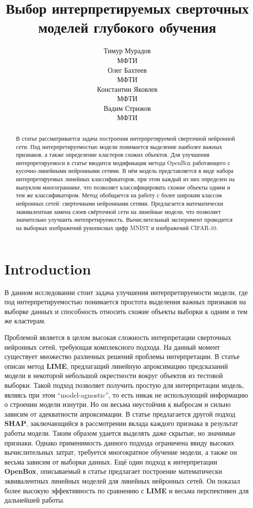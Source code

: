 \documentclass[12pt]{article}
\title{Выбор интерпретируемых сверточных моделей глубокого обучения}
\author{ Тимур Мурадов\\
	МФТИ\\
	\And
	Олег Бахтеев \\
	МФТИ\\
	\And
	Константин Яковлев \\
	МФТИ\\
	\And
	Вадим Стрижов \\
	МФТИ\\
}
\date{}
\begin{document}
\maketitle

\begin{abstract}
	В статье рассматривается задача построения интерпретируемой сверточной нейронной сети. Под интерпретируемостью модели понимается выделение наиболее важных признаков, а также определение кластеров схожих объектов. Для улучшения интерпретируемоси в статье вводится модификация метода OpenBox работающего с  кусочно-линейными нейронными сетями. В нём модель представляется в виде набора интерпретируемых линейных классификаторов, при этом каждый из них определен на выпуклом многограннике, что позволяет классифицировать схожие объекты одним и тем же классификатором. Метод обобщается на работу с более широким классом нейронных сетей: сверточными нейронными сетями. Предлагается математически эквивалентная замена слоев свёрточной сети на линейные модели, что позволяет значительно улучшить интепретируемость. Вычислительный эксперимент проводится на выборках изображений рукописных цифр MNIST и изображений CIFAR-10.
\end{abstract}



\section{Introduction}
В данном исследовании стоит задача улучшения интерпретируемости модели, где под интерпретируемостью понимается простота выделения важных признаков на выборке данных и способность относить схожие объекты выборки к одним и тем же кластерам.

Проблемой является в целом высокая сложность интерпретации сверточных нейронных сетей, требующая комплексного подхода. На данный момент существует множество различных решений проблемы интерпретации. В статье \cite{ribeiro2016why} описан метод \textbf{LIME}, предлагащий линейную апроксимацию предсказаний модели в некоторой небольшой окрестности вокруг объектов из тестовой выборки. Такой подход позволяет получить простую для интерпретации модель, являясь при этом \textquotedblleft model-agnostic\textquotedblright, то есть никак не использующий информацию о строении модели изнутри. Но он весьма неустойчив к выбросам и сильно зависим от адекватности апроксимации. В статье \cite{Lundberg2017aunified} предлагается другой подход \textbf{SHAP}, заключающийся в рассмотрении вклада каждого признака в результат работы модели. Таким образом удается выделять даже скрытые, но значимые признаки. Однако применимость данного подхода ограничена ввиду высоких вычислительных затрат, требуется многократное обучение модели, а также он весьма зависим от выборки данных. Ещё один подход к интерпретации \textbf{OpenBox}, описываемый в статье \cite{chu2019exact} предлагает построение математически эквивалентных линейных моделей для линейных нейронных сетей. Он показал более высокую эффективность по сравнению с \textbf{LIME} и весьма перспективен для дальнейшей работы.
\end{document}
